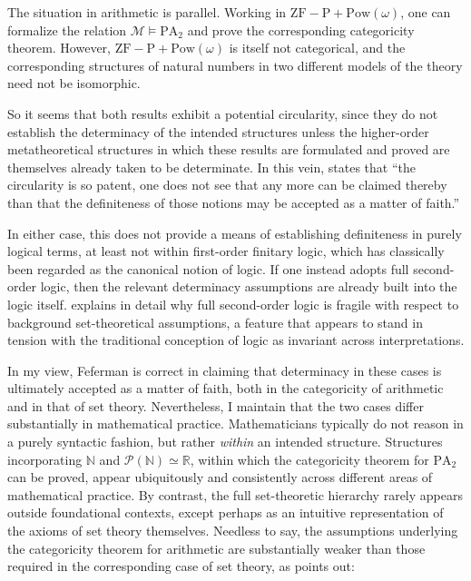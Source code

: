 \documentclass[11pt,a4paper]{book}
\theoremstyle{plain}
\begin{document}
The situation in arithmetic is parallel. Working in $\mathrm{ZF\!-\!P}+\mathrm{Pow}(\omega)$, one can formalize the relation $\mathcal{M} \models \mathrm{PA}_2$ and prove the corresponding categoricity theorem. However, $\mathrm{ZF\!-\!P}+\mathrm{Pow}(\omega)$ is itself not categorical, and the corresponding structures of natural numbers in two different models of the theory need not be isomorphic.

So it seems that both results exhibit a potential circularity, since they do not establish the determinacy of the intended structures unless the higher-order metatheoretical structures in which these results are formulated and proved are themselves already taken to be determinate. In this vein, \textcite[20]{Feferman2011a} states that ``the circularity is so patent, one does not see that any more can be claimed thereby than that the definiteness of those notions may be accepted as a matter of faith.''

In either case, this does not provide a means of establishing definiteness in purely logical terms, at least not within first-order finitary logic, which has classically been regarded as the canonical notion of logic. If one instead adopts full second-order logic, then the relevant determinacy assumptions are already built into the logic itself. \textcite{Koellner2010SecondOrderLogic} explains in detail why full second-order logic is fragile with respect to background set-theoretical assumptions, a feature that appears to stand in tension with the traditional conception of logic as invariant across interpretations.

In my view, Feferman is correct in claiming that determinacy in these cases is ultimately accepted as a matter of faith, both in the categoricity of arithmetic and in that of set theory. Nevertheless, I maintain that the two cases differ substantially in mathematical practice. Mathematicians typically do not reason in a purely syntactic fashion, but rather \textit{within} an intended structure. Structures incorporating $\mathbb{N}$ and $\mathcal{P}(\mathbb{N}) \simeq \mathbb{R}$, within which the categoricity theorem for $\mathrm{PA}_2$ can be proved, appear ubiquitously and consistently across different areas of mathematical practice. By contrast, the full set-theoretic hierarchy rarely appears outside foundational contexts, except perhaps as an intuitive representation of the axioms of set theory themselves. Needless to say, the assumptions underlying the categoricity theorem for arithmetic are substantially weaker than those required in the corresponding case of set theory, as \textcite[141]{Ferreiros2023ConStructuralism} points out:
\end{document}
